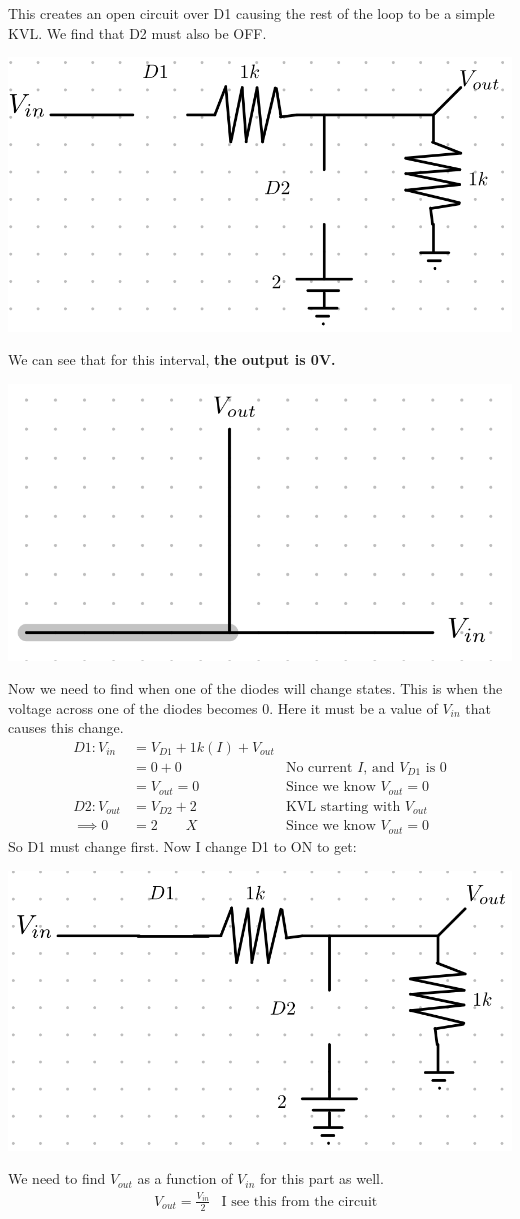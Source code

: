 \documentclass[12pt,letterpaper]{article} \usepackage{amsmath} \usepackage{graphicx} \usepackage[margin=1in]{geometry} \usepackage{longtable}  \usepackage{amssymb}
\begin{document}
\begin{mdframed}[]
	This creates an open circuit over D1 causing the rest of the loop to be a simple KVL. We find that D2 must also be OFF. 
	\begin{center}
		\includegraphics[width=0.4\linewidth]{diodes-plotting-1.2}
	\end{center}
	We can see that for this interval, \textbf{the output is 0V.}
	\begin{center}
		\includegraphics[width=0.3\linewidth]{diodes-plotting-1.3}
	\end{center}
	Now we need to find when one of the diodes will change states. This is when the voltage across one of the diodes becomes 0. Here it must be a value of $V_{in}$ that causes this change. 
	\begin{align*}
		D1: V_{in} &= V_{D1} + 1k(I) + V_{out}&\\
			&=0 + 0 & \text{No current $I$, and $V_{D1}$ is 0}\\
			&= V_{out} = 0 &\text{Since we know $V_{out}=0$}\\
		D2: V_{out} &= V_{D2} + 2&\text{KVL starting with $V_{out}$}\\
			\implies 0 &= 2 \qquad X &\text{Since we know $V_{out}=0$}
	\end{align*}
	So D1 must change first. Now I change D1 to ON to get:
	\begin{center}
		\includegraphics[width=0.4\linewidth]{diodes-plotting-1.4}
	\end{center}
	We need to find $V_{out}$ as a function of $V_{in}$ for this part as well. 
	\begin{align*}
		&V_{out} = \frac{V_{in}}{2}&\text{I see this from the circuit} \\

\end{align*}
\end{mdframed}
\end{document}
